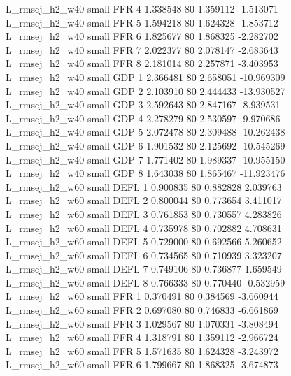 L_rmsej_h2_w40      small      FFR                 4 1.338548 80       1.359112          -1.513071
L_rmsej_h2_w40      small      FFR                 5 1.594218 80       1.624328          -1.853712
L_rmsej_h2_w40      small      FFR                 6 1.825677 80       1.868325          -2.282702
L_rmsej_h2_w40      small      FFR                 7 2.022377 80       2.078147          -2.683643
L_rmsej_h2_w40      small      FFR                 8 2.181014 80       2.257871          -3.403953
L_rmsej_h2_w40      small      GDP                 1 2.366481 80       2.658051         -10.969309
L_rmsej_h2_w40      small      GDP                 2 2.103910 80       2.444433         -13.930527
L_rmsej_h2_w40      small      GDP                 3 2.592643 80       2.847167          -8.939531
L_rmsej_h2_w40      small      GDP                 4 2.278279 80       2.530597          -9.970686
L_rmsej_h2_w40      small      GDP                 5 2.072478 80       2.309488         -10.262438
L_rmsej_h2_w40      small      GDP                 6 1.901532 80       2.125692         -10.545269
L_rmsej_h2_w40      small      GDP                 7 1.771402 80       1.989337         -10.955150
L_rmsej_h2_w40      small      GDP                 8 1.643038 80       1.865467         -11.923476
L_rmsej_h2_w60      small     DEFL                 1 0.900835 80       0.882828           2.039763
L_rmsej_h2_w60      small     DEFL                 2 0.800044 80       0.773654           3.411017
L_rmsej_h2_w60      small     DEFL                 3 0.761853 80       0.730557           4.283826
L_rmsej_h2_w60      small     DEFL                 4 0.735978 80       0.702882           4.708631
L_rmsej_h2_w60      small     DEFL                 5 0.729000 80       0.692566           5.260652
L_rmsej_h2_w60      small     DEFL                 6 0.734565 80       0.710939           3.323207
L_rmsej_h2_w60      small     DEFL                 7 0.749106 80       0.736877           1.659549
L_rmsej_h2_w60      small     DEFL                 8 0.766333 80       0.770440          -0.532959
L_rmsej_h2_w60      small      FFR                 1 0.370491 80       0.384569          -3.660944
L_rmsej_h2_w60      small      FFR                 2 0.697080 80       0.746833          -6.661869
L_rmsej_h2_w60      small      FFR                 3 1.029567 80       1.070331          -3.808494
L_rmsej_h2_w60      small      FFR                 4 1.318791 80       1.359112          -2.966724
L_rmsej_h2_w60      small      FFR                 5 1.571635 80       1.624328          -3.243972
L_rmsej_h2_w60      small      FFR                 6 1.799667 80       1.868325          -3.674873
